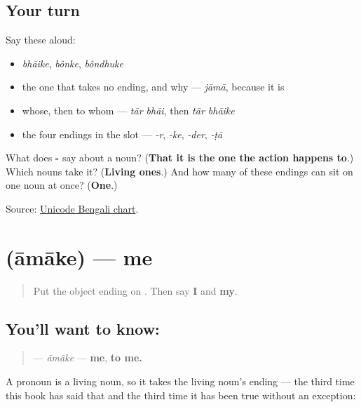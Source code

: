 \subsection*{Your turn}
Say these aloud:

\begin{itemize}
\raggedright
  \item \emph{bhāike}, \emph{bônke}, \emph{bôndhuke}
  \item the one that takes no ending, and why — \emph{jāmā}, because it is \textbf{}
  \item whose, then to whom — \emph{tār bhāi}, then \emph{tār bhāike}
  \item the four endings in the slot — \emph{-r}, \emph{-ke}, \emph{-der}, \emph{-ṭā}
\end{itemize}

\begin{tcolorbox}[breakable,colback=teal!4,colframe=teal!35!black,title={Before you move on}]
What does \textbf{-} say about a noun? (\textbf{That it is the one the action happens to}.) Which nouns take it? (\textbf{Living ones}.) And how many of these endings can sit on one noun at once? (\textbf{One}.)

Source: \href{https://www.unicode.org/charts/PDF/U0980.pdf}{Unicode Bengali chart}.
\end{tcolorbox}
\section[\texorpdfstring{\bn{আমাকে} (āmāke)}{আমাকে (āmāke)}]{ (āmāke) — me}

\label{lesson:BN-C25-amake}



\begin{quote}
Put the object ending on \textbf{}. Then say \textbf{I} and \textbf{my}.
\end{quote}

\subsection*{You'll want to know: }
\begin{quote}
\textbf{} — \emph{āmāke} — \textbf{me}, \textbf{to me.}
\end{quote}

A pronoun is a living noun, so it takes the living noun's ending — the third time this book has said that and the third time it has been true without an exception:

